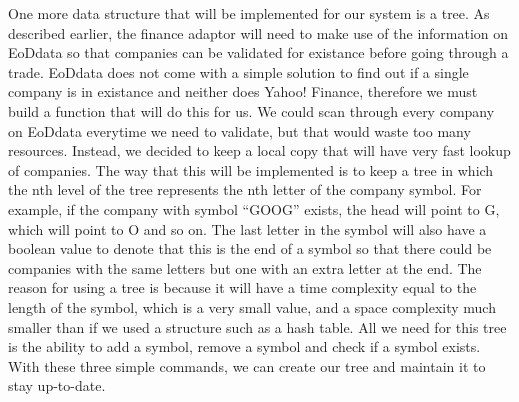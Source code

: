 One more data structure that will be implemented for our system is a tree. As described earlier, the finance adaptor will need to make use of the information on EoDdata so that companies can be validated for existance before going through a trade. EoDdata does not come with a simple solution to find out if a single company is in existance and neither does Yahoo! Finance, therefore we must build a function that will do this for us. We could scan through every company on EoDdata everytime we need to validate, but that would waste too many resources. Instead, we decided to keep a local copy that will have very fast lookup of companies. The way that this will be implemented is to keep a tree in which the nth level of the tree represents the nth letter of the company symbol. For example, if the company with symbol ``GOOG'' exists, the head will point to G, which will point to O and so on. The last letter in the symbol will also have a boolean value to denote that this is the end of a symbol so that there could be companies with the same letters but one with an extra letter at the end. The reason for using a tree is because it will have a time complexity equal to the length of the symbol, which is a very small value, and a space complexity much smaller than if we used a structure such as a hash table. All we need for this tree is the ability to add a symbol, remove a symbol and check if a symbol exists. With these three simple commands, we can create our tree and maintain it to stay up-to-date.
